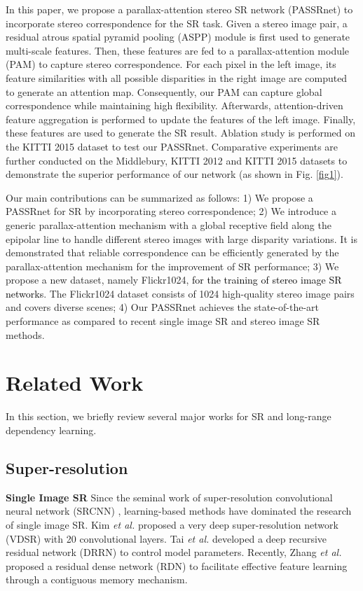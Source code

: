 \documentclass[10pt,twocolumn,letterpaper]{article}
\begin{document}
In this paper, we propose a parallax-attention stereo SR network (PASSRnet) to incorporate stereo correspondence for the SR task. 
Given a stereo image pair, a residual atrous spatial pyramid pooling (ASPP) module is first used to generate multi-scale features.  Then, these features are fed to a parallax-attention module (PAM) to capture stereo correspondence. For each pixel in the left image, its feature similarities with all possible disparities in the right image are computed to generate an attention map. Consequently, our PAM can capture global correspondence while maintaining high flexibility. Afterwards, attention-driven feature aggregation is performed to update the features of the left image. Finally, these features are used to generate the SR result. Ablation study is performed on the KITTI 2015 dataset to test our PASSRnet. Comparative experiments are further conducted on the Middlebury, KITTI 2012 and KITTI 2015 datasets to demonstrate the superior performance of our network (as shown in Fig. \ref{fig1}).

Our main contributions can be summarized as follows: 
1) We propose a PASSRnet for SR by incorporating stereo correspondence;
2) We introduce a generic parallax-attention mechanism with a global receptive field along the epipolar line to handle different stereo images with large disparity variations. It is demonstrated that reliable correspondence can be efficiently generated by the parallax-attention mechanism for the improvement of SR performance;
3) We propose a new dataset, namely Flickr1024, \textcolor{black}{for the training of stereo image SR networks}. The Flickr1024 dataset consists of 1024 high-quality stereo image pairs and covers diverse scenes;
4) Our PASSRnet achieves the state-of-the-art performance as compared to recent single image SR and stereo image  SR methods.

\section{Related Work}
In this section, we briefly review several major works for SR and long-range dependency learning.
\subsection{Super-resolution}

\noindent 
\textbf{Single Image SR}
Since the seminal work of super-resolution convolutional neural network (SRCNN) \cite{2014-LearningaDeepConvolutionalNetworkforImageSuperResolution-Dong-184-199}, learning-based methods have dominated the research of single image SR. Kim \emph{et al.} \cite{2016-AccurateImageSuperResolutionUsingVeryDeepConvolutionalNetworks-Kim-1646-1654} proposed a very deep super-resolution network (VDSR) with 20 convolutional layers. Tai \emph{et al.} \cite{2017-ImageSuperResolutionViaDeepRecursiveResidualNetwork-Tai-2790-2798} developed a deep recursive residual network (DRRN) to control model parameters. Recently, Zhang \emph{et al.} \cite{2018-ResidualDenseNetworkforImageSuperResolution-Zhang--} proposed a residual dense network (RDN) to facilitate effective feature learning through a contiguous memory mechanism.
\end{document}
